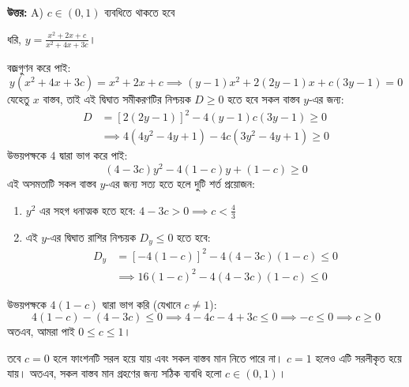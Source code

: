 \documentclass[12pt, a4paper]{article}
\begin{document}
\vspace{0.5em}
\begin{tcolorbox}[answerbox]
    \textbf{\color{success} উত্তর:} A) $c \in (0, 1)$ ব্যবধিতে থাকতে হবে
\end{tcolorbox}
\vspace{1em}

\begin{tcolorbox}[solutionbox={সমাধান (Solution)}]
    \noindent
    ধরি, $y = \frac{x^2 + 2x + c}{x^2 + 4x + 3c}$।
    
    বজ্রগুণন করে পাই:
    \[ y(x^2 + 4x + 3c) = x^2 + 2x + c \implies (y-1)x^2 + 2(2y-1)x + c(3y-1) = 0 \]
    যেহেতু $x$ বাস্তব, তাই এই দ্বিঘাত সমীকরণটির নিশ্চয়ক $D \ge 0$ হতে হবে সকল বাস্তব $y$-এর জন্য:
    \begin{align*}
        D &= [2(2y-1)]^2 - 4(y-1)c(3y-1) \ge 0 \\
        &\implies 4(4y^2 - 4y + 1) - 4c(3y^2 - 4y + 1) \ge 0
    \end{align*}
    উভয়পক্ষকে $4$ দ্বারা ভাগ করে পাই:
    \[ (4 - 3c)y^2 - 4(1-c)y + (1-c) \ge 0 \]
    এই অসমতাটি সকল বাস্তব $y$-এর জন্য সত্য হতে হলে দুটি শর্ত প্রয়োজন:
    \begin{enumerate}
        \item $y^2$ এর সহগ ধনাত্মক হতে হবে: $4 - 3c > 0 \implies c < \frac{4}{3}$
        \item এই $y$-এর দ্বিঘাত রাশির নিশ্চয়ক $D_y \le 0$ হতে হবে:
        \begin{align*}
            D_y &= [-4(1-c)]^2 - 4(4-3c)(1-c) \le 0 \\
            &\implies 16(1-c)^2 - 4(4-3c)(1-c) \le 0
        \end{align*}
    \end{enumerate}
    উভয়পক্ষকে $4(1-c)$ দ্বারা ভাগ করি (যেখানে $c \ne 1$):
    \[ 4(1-c) - (4-3c) \le 0 \implies 4 - 4c - 4 + 3c \le 0 \implies -c \le 0 \implies c \ge 0 \]
    অতএব, আমরা পাই $0 \le c \le 1$। 
    
    তবে $c=0$ হলে ফাংশনটি সরল হয়ে যায় এবং সকল বাস্তব মান নিতে পারে না। $c=1$ হলেও এটি সরলীকৃত হয়ে যায়। অতএব, সকল বাস্তব মান গ্রহণের জন্য সঠিক ব্যবধি হলো $c \in (0, 1)$।
\end{tcolorbox}

\vspace{1em}
\end{document}
